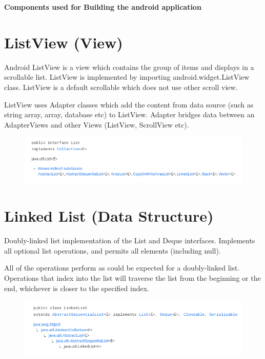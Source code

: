 \documentclass[11pt,a4paper]{report}
\begin{document}
\textbf{{\large{Components used for Building the android application}}}
\section{ListView (View)}
\vskip 0.5cm
Android ListView is a view which contains the group of items and displays in a scrollable list. ListView is implemented by importing android.widget.ListView class. 
ListView is a default scrollable which does not use other scroll view.

ListView uses Adapter classes which add the content from data source (such as string array, array, database etc) to ListView. Adapter
 bridges data between an AdapterViews and other Views (ListView, ScrollView etc).

\begin{figure}[H]
	\centering
	\includegraphics[scale=0.75]{./img/Screenshot (146).png}
\end{figure}


\section{Linked List (Data Structure)}
Doubly-linked list implementation of the List and Deque interfaces. Implements all optional list operations, and permits all elements (including null).

All of the operations perform as could be expected for a doubly-linked list. Operations that index into the list will traverse the list from the beginning or the end, whichever is closer to the specified index.
	\begin{figure}[H]
		\centering
    \includegraphics[scale=0.75]{./img/Screenshot (145).png}
  
	\end{figure}
\end{document}
